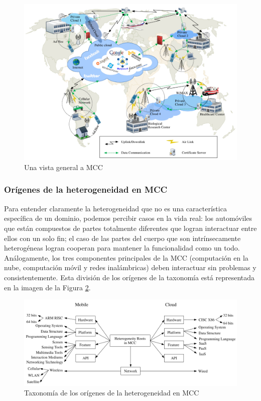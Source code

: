 \begin{figure}[h]
 \includegraphics[scale=0.45]{Figures/mccheterogeinity}
 \caption{Una vista general a MCC \cite{sanaei2014heterogeneity}}
 \label{fig:mccheterogeinity}
\end{figure}

\subsubsection{Orígenes de la heterogeneidad en MCC}

Para entender claramente la heterogeneidad que no es una característica específica de un dominio, podemos percibir casos en la vida real:
los automóviles que están compuestos de partes totalmente diferentes que logran interactuar entre ellos con un solo fin; el caso de las
partes del cuerpo que
son intrínsecamente heterogéneas logran cooperan para mantener la funcionalidad como un todo. Análogamente, los tres componentes principales 
de la MCC (computación en la nube, computación móvil y redes inalámbricas) deben interactuar sin problemas y consistentemente. Esta división 
de los orígenes de la taxonomía está representada en la imagen de la Figura \ref{fig:heterogeinityRootsmcc}. 


\begin{figure}[h]
 \includegraphics[scale=0.45]{Figures/heterogeinityRootsmcc}
 \caption{Taxonomía de los orígenes de la heterogeneidad en MCC \cite{sanaei2014heterogeneity}}
 \label{fig:heterogeinityRootsmcc}
\end{figure}


